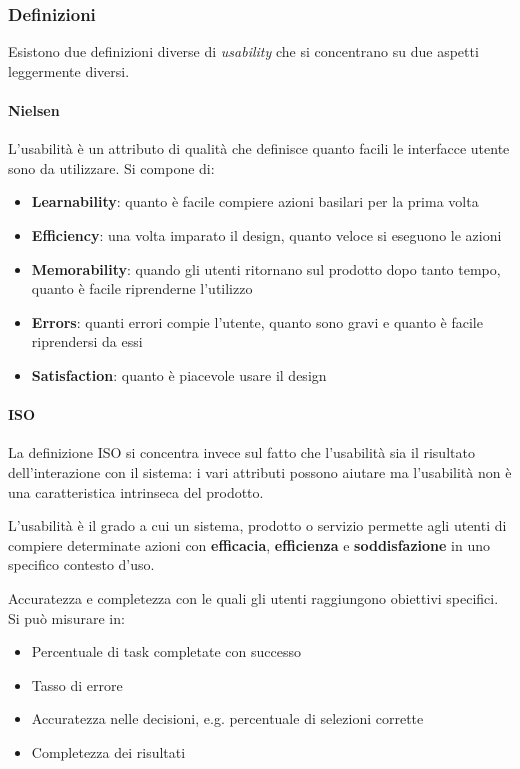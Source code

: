 \subsubsection{Definizioni}
Esistono due definizioni diverse di \textit{usability} che si concentrano su due aspetti leggermente diversi.
\paragraph{Nielsen}
\begin{definition}
	L'usabilità è un attributo di qualità che definisce quanto facili le interfacce utente sono da utilizzare. Si compone di:
	\begin{itemize}
		\item \textbf{Learnability}: quanto è facile compiere azioni basilari per la prima volta
		\item \textbf{Efficiency}: una volta imparato il design, quanto veloce si eseguono le azioni
		\item \textbf{Memorability}: quando gli utenti ritornano sul prodotto dopo tanto tempo, quanto è facile riprenderne l'utilizzo
		\item \textbf{Errors}: quanti errori compie l'utente, quanto sono gravi e quanto è facile riprendersi da essi
		\item \textbf{Satisfaction}: quanto è piacevole usare il design
	\end{itemize}
\end{definition}

\paragraph{ISO} La definizione ISO si concentra invece sul fatto che l'usabilità sia il risultato dell'interazione con il sistema: i vari attributi possono aiutare ma l'usabilità non è una caratteristica intrinseca del prodotto.
\begin{definition}
	L'usabilità è il grado a cui un sistema, prodotto o servizio permette agli utenti di compiere determinate azioni con \textbf{efficacia}, \textbf{efficienza} e \textbf{soddisfazione} in uno specifico contesto d'uso.
\end{definition}

\begin{definition}[Efficacia]
	Accuratezza e completezza con le quali gli utenti raggiungono obiettivi specifici. Si può misurare in:
	\begin{itemize}
		\item Percentuale di task completate con successo
		\item Tasso di errore
		\item Accuratezza nelle decisioni, e.g. percentuale di selezioni corrette
		\item Completezza dei risultati
	\end{itemize}
\end{definition}

